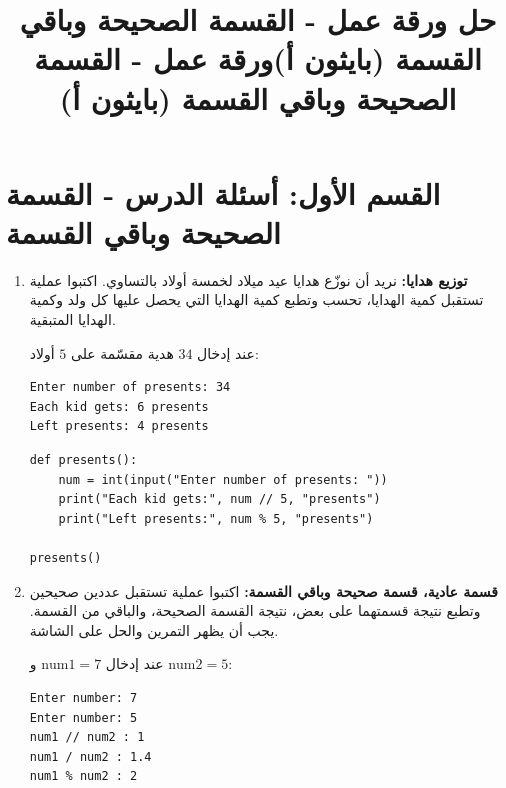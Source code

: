 \documentclass[14pt]{extarticle}
\title{حل ورقة عمل - القسمة الصحيحة وباقي القسمة (بايثون أ)}
\title{ورقة عمل - القسمة الصحيحة وباقي القسمة (بايثون أ)}
\begin{document}
\maketitle
\thispagestyle{fancy}

\section*{القسم الأول: أسئلة الدرس - القسمة الصحيحة وباقي القسمة}

\begin{enumerate}[label=\textbf{تمرين \arabic*:}, wide=0pt, itemsep=2.2em]

\item \textbf{توزيع هدايا:} نريد أن نوزّع هدايا عيد ميلاد لخمسة أولاد بالتساوي.
اكتبوا عملية تستقبل كمية الهدايا، تحسب وتطبع كمية الهدايا التي يحصل عليها كل ولد وكمية الهدايا المتبقية.

\ifdetailed
\begin{boxExample}
عند إدخال $34$ هدية مقسّمة على $5$ أولاد:
\begin{english}
\begin{verbatim}
Enter number of presents: 34
Each kid gets: 6 presents
Left presents: 4 presents
\end{verbatim}
\end{english}
\end{boxExample}
\fi

\ifwithsols
\begin{boxSolution}
\begin{english}
\begin{verbatim}
def presents():
    num = int(input("Enter number of presents: "))
    print("Each kid gets:", num // 5, "presents")
    print("Left presents:", num % 5, "presents")

presents()
\end{verbatim}
\end{english}
\end{boxSolution}
\fi
\filbreak

\item \textbf{قسمة عادية، قسمة صحيحة وباقي القسمة:} اكتبوا عملية تستقبل عددين صحيحين وتطبع نتيجة قسمتهما على بعض، نتيجة القسمة الصحيحة، والباقي من القسمة. يجب أن يظهر التمرين والحل على الشاشة.

\ifdetailed
\begin{boxExample}
عند إدخال $\text{num1} = 7$ و $\text{num2} = 5$:
\begin{english}
\begin{verbatim}
Enter number: 7
Enter number: 5
num1 // num2 : 1
num1 / num2 : 1.4
num1 % num2 : 2
\end{verbatim}
\end{english}
\end{boxExample}
\fi


\end{enumerate}
\end{document}
